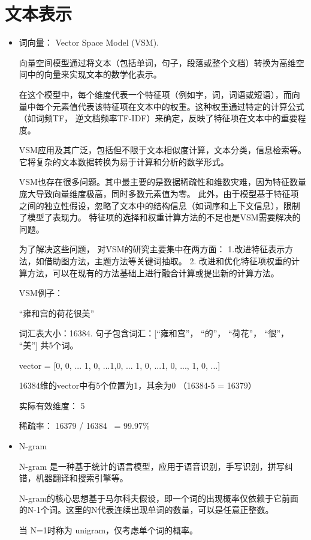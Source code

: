 \documentclass{article}
\begin{document}
\section{文本表示}
\begin{itemize}
    \item 词向量： Vector Space Model (VSM). 
    
    向量空间模型通过将文本（包括单词，句子，段落或整个文档）转换为高维空间中的向量来实现文本的数学化表示。
    
    在这个模型中，每个维度代表一个特征项（例如字，词，词语或短语），而向量中每个元素值代表该特征项在文本中的权重。这种权重通过特定的计算公式（如词频TF， 逆文档频率TF-IDF）来确定，反映了特征项在文本中的重要程度。

    VSM应用及其广泛，包括但不限于文本相似度计算，文本分类，信息检索等。 它将复杂的文本数据转换为易于计算和分析的数学形式。

    VSM也存在很多问题。其中最主要的是数据稀疏性和维数灾难，因为特征数量庞大导致向量维度极高，同时多数元素值为零。
    此外，由于模型基于特征项之间的独立性假设，忽略了文本中的结构信息（如词序和上下文信息），限制了模型了表现力。
    特征项的选择和权重计算方法的不足也是VSM需要解决的问题。

    为了解决这些问题， 对VSM的研究主要集中在两方面： 1.改进特征表示方法，如借助图方法，主题方法等关键词抽取。 2. 改进和优化特征项权重的计算方法，可以在现有的方法基础上进行融合计算或提出新的计算方法。

    VSM例子：

    “雍和宫的荷花很美”
    
    词汇表大小：16384. 句子包含词汇：[“雍和宫”， “的”， “荷花”， “很”， “美”] 共5个词。

    vector = [0, 0, ... 1, 0, ...1,0, ... 1, 0, ...1, 0, ..., 1, 0, ...]

    16384维的vector中有5个位置为1，其余为0 （16384-5 = 16379）
    
    实际有效维度： 5

    稀疏率： 16379 / 16384 ~= 99.97\%


    \item N-gram
    
    N-gram 是一种基于统计的语言模型，应用于语音识别，手写识别，拼写纠错，机器翻译和搜索引擎等。

    N-gram的核心思想基于马尔科夫假设，即一个词的出现概率仅依赖于它前面的N-1个词。这里的N代表连续出现单词的数量，可以是任意正整数。

    当 N=1时称为 unigram，仅考虑单个词的概率。 


\end{itemize}
\end{document}
